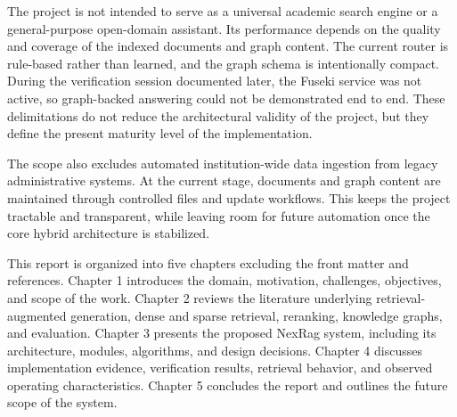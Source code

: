 The project is not intended to serve as a universal academic search engine or a general-purpose open-domain assistant. Its performance depends on the quality and coverage of the indexed documents and graph content. The current router is rule-based rather than learned, and the graph schema is intentionally compact. During the verification session documented later, the Fuseki service was not active, so graph-backed answering could not be demonstrated end to end. These delimitations do not reduce the architectural validity of the project, but they define the present maturity level of the implementation.

The scope also excludes automated institution-wide data ingestion from legacy administrative systems. At the current stage, documents and graph content are maintained through controlled files and update workflows. This keeps the project tractable and transparent, while leaving room for future automation once the core hybrid architecture is stabilized.

\label{sec:introduction-organization}

This report is organized into five chapters excluding the front matter and references. Chapter 1 introduces the domain, motivation, challenges, objectives, and scope of the work. Chapter 2 reviews the literature underlying retrieval-augmented generation, dense and sparse retrieval, reranking, knowledge graphs, and evaluation. Chapter 3 presents the proposed NexRag system, including its architecture, modules, algorithms, and design decisions. Chapter 4 discusses implementation evidence, verification results, retrieval behavior, and observed operating characteristics. Chapter 5 concludes the report and outlines the future scope of the system.
